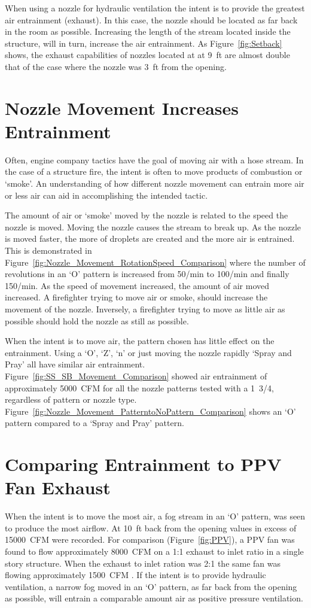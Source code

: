 \documentclass[12pt,oneside]{book}
\begin{document}
When using a nozzle for hydraulic ventilation the intent is to provide the greatest air entrainment (exhaust). In this case, the nozzle should be located as far back in the room as possible. Increasing the length of the stream located inside the structure, will in turn, increase the air entrainment. As Figure~\ref{fig:Setback} shows, the exhaust capabilities of nozzles located at at 9~ft are almost double that of the case where the nozzle was 3~ft from the opening. 

\section{Nozzle Movement Increases Entrainment}
Often, engine company tactics have the goal of moving air with a hose stream. In the case of a structure fire, the intent is often to move products of combustion or `smoke'. An understanding of how different nozzle movement can entrain more air or less air can aid in accomplishing the intended tactic. 

The amount of air or `smoke' moved by the nozzle is related to the speed the nozzle is moved. Moving the nozzle causes the stream to break up. As the nozzle is moved faster, the more of droplets are created and the more air is entrained. This is demonstrated in Figure~\ref{fig:Nozzle_Movement_RotationSpeed_Comparison} where the number of revolutions in an `O' pattern is increased from 50/min to 100/min and finally 150/min. As the speed of movement increased, the amount of air moved increased. A firefighter trying to move air or smoke, should increase the movement of the nozzle. Inversely, a firefighter trying to move as little air as possible should hold the nozzle as still as possible.  

When the intent is to move air, the pattern chosen has little effect on the entrainment. Using a `O', `Z', `n' or just moving the nozzle rapidly `Spray and Pray' all have similar air entrainment. Figure~\ref{fig:SS_SB_Movement_Comparison} showed air entrainment of approximately 5000~CFM for all the nozzle patterns tested with a 1~3/4, regardless of pattern or nozzle type. Figure~\ref{fig:Nozzle_Movement_PatterntoNoPattern_Comparison} shows an `O' pattern compared to a `Spray and Pray' pattern.

\section{Comparing Entrainment to PPV Fan Exhaust}
When the intent is to move the most air, a fog stream in an `O' pattern, was seen to produce the most airflow. At 10~ft back from the opening values in excess of 15000~CFM were recorded. For comparison (Figure~\ref{fig:PPV}), a PPV fan was found to flow approximately 8000~CFM on a 1:1 exhaust to inlet ratio in a single story structure. When the exhaust to inlet ration was 2:1 the same fan was flowing approximately 1500~CFM \cite{Zevotek_Kerber:2016}. If the intent is to provide hydraulic ventilation, a narrow fog moved in an `O' pattern, as far back from the opening as possible, will entrain a comparable amount air as positive pressure ventilation. 
\end{document}
